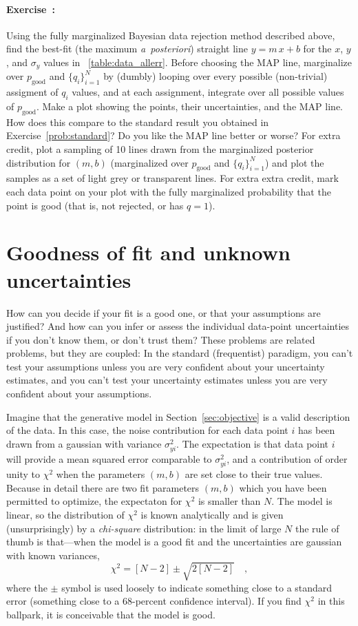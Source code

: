 \documentclass[12pt,twoside]{article}
\newcommand{\notenglish}[1]{\textsl{#1}}
\newcommand{\aposteriori}{\notenglish{a~posteriori}}
\newcommand{\sectionname}{Section}
\newcommand{\problemname}{Exercise}
\newcounter{problem}
\newenvironment{problem}{\paragraph{\problemname~\theproblem:}\refstepcounter{problem}}{}
\newcommand{\setofall}[3]{\{{#1}\}_{{#2}}^{{#3}}}
\newcommand{\allq}{\setofall{q_i}{i=1}{N}}
\newcommand{\pgood}{p_{\mathrm{good}}}
\begin{document}
\begin{problem}
Using the fully marginalized Bayesian data rejection method described
above, find the best-fit (the maximum \aposteriori) straight line
$y=m\,x+b$ for the $x$, $y$, and $\sigma_y$ values in
\tablename~\ref{table:data_allerr}.  Before choosing the MAP line,
marginalize over $\pgood$ and $\allq$ by (dumbly) looping over every
possible (non-trivial) assigment of $q_i$ values, and at each
assignment, integrate over all possible values of $\pgood$.  Make a
plot showing the points, their uncertainties, and the MAP line.  How
does this compare to the standard result you obtained in
\problemname~\ref{prob:standard}?  Do you like the MAP line better or
worse?  For extra credit, plot a sampling of 10 lines drawn from the
marginalized posterior distribution for $(m,b)$ (marginalized over
$\pgood$ and $\allq$) and plot the samples as a set of light grey or
transparent lines.  For extra extra credit, mark each data point on
your plot with the fully marginalized probability that the point is
good (that is, not rejected, or has $q=1$).
\end{problem}

\section{Goodness of fit and unknown uncertainties}\label{sec:goodness}

How can you decide if your fit is a good one, or that your assumptions
are justified?  And how can you infer or assess the individual
data-point uncertainties if you don't know them, or don't trust them?
These problems are related problems, but they are coupled: In the
standard (frequentist) paradigm, you can't test your assumptions
unless you are very confident about your uncertainty estimates, and
you can't test your uncertainty estimates unless you are very
confident about your assumptions.

Imagine that the generative model in \sectionname~\ref{sec:objective}
is a valid description of the data.  In this case, the noise
contribution for each data point $i$ has been drawn from a gaussian
with variance $\sigma_{yi}^2$.  The expectation is that data point $i$
will provide a mean squared error comparable to $\sigma_{yi}^2$, and a
contribution of order unity to $\chi^2$ when the parameters $(m,b)$
are set close to their true values.  Because in detail there are two
fit parameters $(m,b)$ which you have been permitted to optimize, the
expectaton for $\chi^2$ is smaller than $N$. The model is linear, so
the distribution of $\chi^2$ is known analytically and is given
(unsurprisingly) by a \emph{chi-square} distribution: in the limit of
large $N$ the rule of thumb is that---when the model is a good fit and
the uncertainties are gaussian with known variances,
\begin{equation}
\chi^2 = [N-2] \pm \sqrt{2[N-2]} \quad ,
\end{equation}
where the $\pm$ symbol is used loosely to indicate something close to
a standard error (something close to a 68-percent confidence
interval).  If you find $\chi^2$ in this ballpark, it is conceivable
that the model is good.
\end{document}
